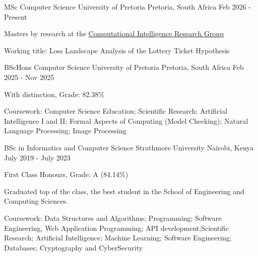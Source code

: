 

\begin{cventries}

\cventry
    {MSc Computer Science} %
    {University of Pretoria} %
    {Pretoria, South Africa} %
    {Feb 2026 - Present} %
    {
      \begin{cvitems} %
        \item {Masters by research at the \href{https://cirg.cs.up.ac.za/}{Computational Intelligence Research Group}}
        \item {Working title: Loss Landscape Analysis of the Lottery Ticket Hypothesis}
      \end{cvitems}
    }

\cventry
    {BScHons Computer Science} %
    {University of Pretoria} %
    {Pretoria, South Africa} %
    {Feb 2025 - Nov 2025} %
    {
      \begin{cvitems} %
        \item With distinction, Grade: 82.38\%
        \item {Coursework: Computer Science Education; Scientific Research; Artificial Intelligence I and II; Formal Aspects of Computing (Model Checking); Natural Language Processing; Image Processing}
      \end{cvitems}
    }
    
  \cventry
    {BSc in Informatics and Computer Science} %
    {Strathmore University} %
    {Nairobi, Kenya} %
    {July 2019 - July 2023} %
    {
      \begin{cvitems} %
        \item {First Class Honours, Grade: A (84.14\%)}
        \item {Graduated top of the class, the best student in the School of Engineering and Computing Sciences.}
        \item {Coursework: Data Structures and Algorithms; Programming; Software Engineering, Web Application Programming; API development;Scientific Research; Artificial Intelligence; Machine Learning; Software Engineering; Databases; Cryptography and CyberSecurity}
      \end{cvitems}
    }
    

\end{cventries}
